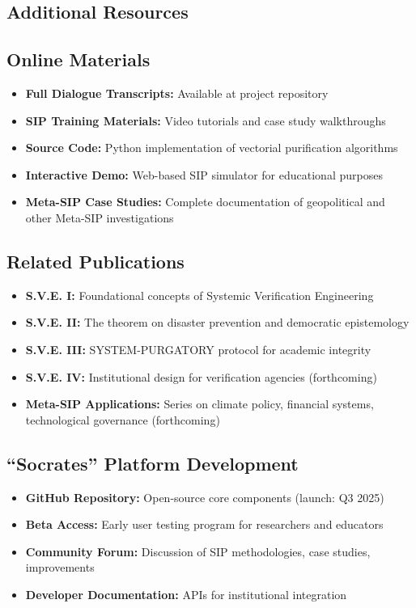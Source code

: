 \documentclass[11pt,a4paper]{article}
\begin{document}
\begin{small}
\section{Additional Resources}
\label{app:resources}

\subsection*{Online Materials}
\begin{itemize}[leftmargin=*]
    \item \textbf{Full Dialogue Transcripts:} Available at project repository
    \item \textbf{SIP Training Materials:} Video tutorials and case study walkthroughs
    \item \textbf{Source Code:} Python implementation of vectorial purification algorithms
    \item \textbf{Interactive Demo:} Web-based SIP simulator for educational purposes
    \item \textbf{Meta-SIP Case Studies:} Complete documentation of geopolitical and other Meta-SIP investigations
\end{itemize}

\subsection*{Related Publications}
\begin{itemize}[leftmargin=*]
    \item \textbf{S.V.E. I:} Foundational concepts of Systemic Verification Engineering
    \item \textbf{S.V.E. II:} The theorem on disaster prevention and democratic epistemology
    \item \textbf{S.V.E. III:} SYSTEM-PURGATORY protocol for academic integrity \citep{KovnatskySVE3}
    \item \textbf{S.V.E. IV:} Institutional design for verification agencies (forthcoming)
    \item \textbf{Meta-SIP Applications:} Series on climate policy, financial systems, technological governance (forthcoming)
\end{itemize}

\subsection*{``Socrates'' Platform Development}
\begin{itemize}[leftmargin=*]
    \item \textbf{GitHub Repository:} Open-source core components (launch: Q3 2025)
    \item \textbf{Beta Access:} Early user testing program for researchers and educators
    \item \textbf{Community Forum:} Discussion of SIP methodologies, case studies, improvements
    \item \textbf{Developer Documentation:} APIs for institutional integration
\end{itemize}


\end{small}
\end{document}
